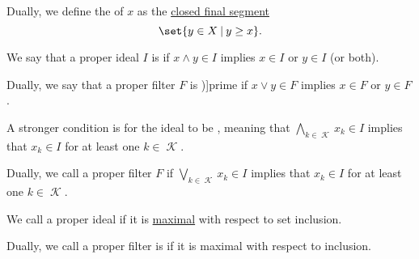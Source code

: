 \begin{definition}
\begin{thmenum}
\begin{paracol}{2}
      \begin{rightcolumn}
        Dually, we define the  of \( x \) as the \hyperref[def:order_interval/unbounded]{closed final segment}
        \begin{equation*}
          \set{ y \in X \given y \geq x }.
        \end{equation*}
      \end{rightcolumn}
    \end{paracol}

    \begin{paracol}{2}
      \begin{leftcolumn}
        We say that a proper ideal \( I \) is  if \( {x \wedge y \in I} \) implies \( {x \in I} \) or \( {y \in I} \) (or both).
      \end{leftcolumn}

      \begin{rightcolumn}
        Dually, we say that a proper filter \( F \) is \term[ru=простой (фильтр) (\cite[183]{Гуров2013ТеорияРешёток})]{prime} if \( {x \vee y \in F} \) implies \( {x \in F} \) or \( {y \in F} \).
      \end{rightcolumn}
    \end{paracol}

    \begin{paracol}{2}
      \begin{leftcolumn}
        A stronger condition is for the ideal to be , meaning that \( \bigwedge_{k \in \mscrK} x_k \in I \) implies that \( x_k \in I \) for at least one \( k \in \mscrK \).
      \end{leftcolumn}

      \begin{rightcolumn}
        Dually, we call a proper filter \( F \)  if \( \bigvee_{k \in \mscrK} x_k \in I \) implies that \( x_k \in I \) for at least one \( k \in \mscrK \).
      \end{rightcolumn}
    \end{paracol}

    \begin{paracol}{2}
      \begin{leftcolumn}
        We call a proper ideal  if it is \hyperref[def:extremal_points/maximal_and_minimal_element]{maximal} with respect to set inclusion.
      \end{leftcolumn}

      \begin{rightcolumn}
        Dually, we call a proper filter is  if it is maximal with respect to inclusion.
      \end{rightcolumn}
    \end{paracol}
  \end{thmenum}
\end{definition}


